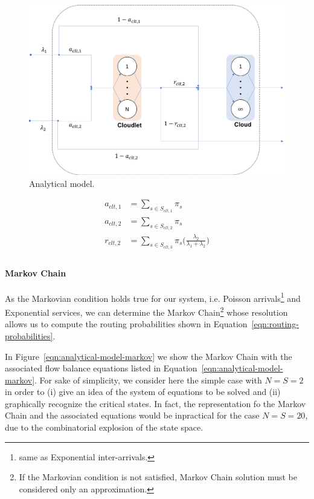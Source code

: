 \begin{figure}
	\includegraphics[width=\columnwidth]{fig/analytical-model}
	\caption{Analytical model.}
	\label{fig:analytical-model}
\end{figure}

\begin{equation} 
\begin{split}
a_{clt,1} & = \sum_{s\in S_{clt,1}} \pi_{s} \\
a_{clt,2} & = \sum_{s\in S_{clt,2}} \pi_{s} \\
r_{clt,2} & = \sum_{s\in S_{clt,3}} \pi_{s} \Big(\frac{\lambda_{2}}{\lambda_{1}+\lambda_{2}}\Big) \\
\end{split}
\label{eqn:routing-probabilities}
\end{equation}


\paragraph{Markov Chain}
As the Markovian condition holds true for our system, i.e. Poisson arrivals\footnote{same as Exponential inter-arrivals.} and Exponential services, we can determine the Markov Chain\footnote{If the Markovian condition is not satisfied, Markov Chain solution must be considered only an approximation.} whose resolution allows us to compute the routing probabilities shown in Equation~\ref{eqn:routing-probabilities}.

In Figure~\ref{eqn:analytical-model-markov} we show the Markov Chain with the associated flow balance equations listed in Equation~\ref{eqn:analytical-model-markov}.
For sake of simplicity, we consider here the simple case with $N=S=2$ in order to (i) give an idea of the system of equations to be solved and (ii) graphically recognize the critical states. In fact, the representation fo the Markov Chain and the associated equations would be inpractical for the case $N=S=20$, due to the combinatorial explosion of the state space.

